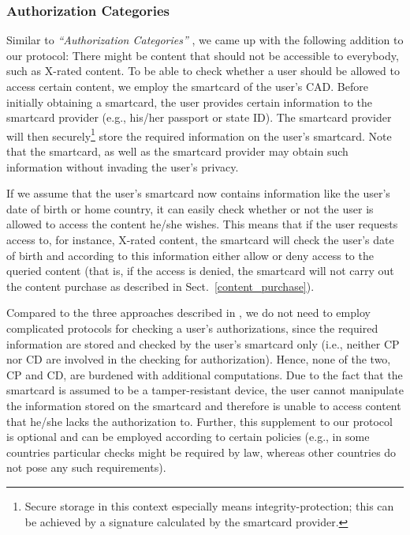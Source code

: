 \documentclass{llncs}
\newcommand{\refSec}[1]{Sect.~\ref{#1}}
\begin{document}
\subsubsection{Authorization Categories} \label{authorization_categories}

Similar to \emph{``Authorization Categories''} \cite{perlman_privacy_preserving}, we came up with the following addition to our protocol: There might be content that should not be accessible to everybody, such as X-rated content. To be able to check whether a user should be allowed to access certain content, we employ the smartcard of the user's CAD. Before initially obtaining a smartcard, the user provides certain information to the smartcard provider (e.g., his/her passport or state ID). The smartcard provider will then securely\footnote{Secure storage in this context especially means integrity-protection; this can be achieved by a signature calculated by the smartcard provider.} store the required information on the user's smartcard. Note that the smartcard, as well as the smartcard provider may obtain such information without invading the user's privacy.

If we assume that the user's smartcard now contains information like the user's date of birth or home country, it can easily check whether or not the user is allowed to access the content he/she wishes. This means that if the user requests access to, for instance, X-rated content, the smartcard will check the user's date of birth and according to this information either allow or deny access to the queried content (that is, if the access is denied, the smartcard will not carry out the content purchase as described in \refSec{content_purchase}).

Compared to the three approaches described in \cite{perlman_privacy_preserving}, we do not need to employ complicated protocols for checking a user's authorizations, since the required information are stored and checked by the user's smartcard only (i.e., neither CP nor CD are involved in the checking for authorization). Hence, none of the two, CP and CD, are burdened with additional computations. Due to the fact that the smartcard is assumed to be a tamper-resistant device, the user cannot manipulate the information stored on the smartcard and therefore is unable to access content that he/she lacks the authorization to. Further, this supplement to our protocol is optional and can be employed according to certain policies (e.g., in some countries particular checks might be required by law, whereas other countries do not pose any such requirements).
\end{document}
